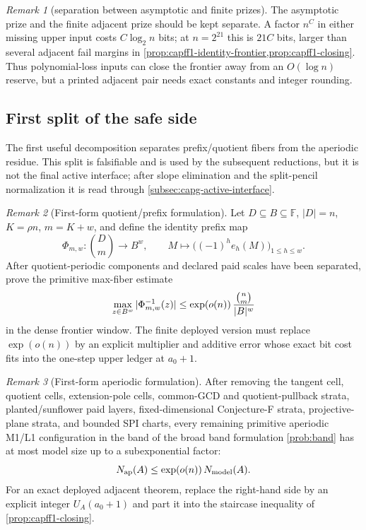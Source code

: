 \documentclass[11pt]{article}
\theoremstyle{definition}
\theoremstyle{remark}
\newtheorem{remark}[remark]{Remark}
\newcommand{\F}{\mathbb{F}}
\newcommand{\B}{B}
\begin{document}
\begin{remark}[separation between asymptotic and finite prizes]\label{rem:capfpr-finite-vs-asymp}
The asymptotic prize and the finite adjacent prize should be kept separate.  A factor $n^{C}$ in either missing upper input costs $C\log_2 n$ bits; at $n=2^{21}$ this is $21C$ bits, larger than several adjacent fail margins in \cref{prop:capff1-identity-frontier,prop:capff1-closing}.  Thus polynomial-loss inputs can close the frontier away from an $O(\log n)$ reserve, but a printed adjacent pair needs exact constants and integer rounding.
\end{remark}

\subsection{First split of the safe side}\label{subsec:capfpr-AQ}

The first useful decomposition separates prefix/quotient fibers from the aperiodic residue.  This split is falsifiable and is used by the subsequent reductions, but it is not the final active interface; after slope elimination and the split-pencil normalization it is read through \cref{subsec:capg-active-interface}.

\begin{remark}[First-form quotient/prefix formulation]\label{prob:capfpr-Q}
Let $D\subseteq\B\subseteq\F$, $|D|=n$, $K=\rho n$, $m=K+w$, and define the identity prefix map
\[
        \Phi_{m,w}:\binom Dm\longrightarrow\B^w,
        \qquad
        M\longmapsto\bigl((-1)^h e_h(M)\bigr)_{1\le h\le w}.
\]
After quotient-periodic components and declared paid scales have been separated, prove the primitive max-fiber estimate
\[
        \max_{z\in\B^w}|\Phi_{m,w}^{-1}(z)|
        \le \exp(o(n))\,{\binom n m\over |\B|^w}
\]
in the dense frontier window.  The finite deployed version must replace $\exp(o(n))$ by an explicit multiplier and additive error whose exact bit cost fits into the one-step upper ledger at $a_0+1$.
\end{remark}

\begin{remark}[First-form aperiodic formulation]\label{prob:capfpr-A}
After removing the tangent cell, quotient cells, extension-pole cells, common-GCD and quotient-pullback strata, planted/sunflower paid layers, fixed-dimensional Conjecture-F strata, projective-plane strata, and bounded SPI charts, every remaining primitive aperiodic M1/L1 configuration in the band of the broad band formulation \cref{prob:band} has at most model size up to a subexponential factor:
\[
        N_{\rm ap}(A)\le \exp(o(n))\,N_{\rm model}(A).
\]
For an exact deployed adjacent theorem, replace the right-hand side by an explicit integer $U_A(a_0+1)$ and part it into the staircase inequality of \cref{prop:capff1-closing}.
\end{remark}
\end{document}
